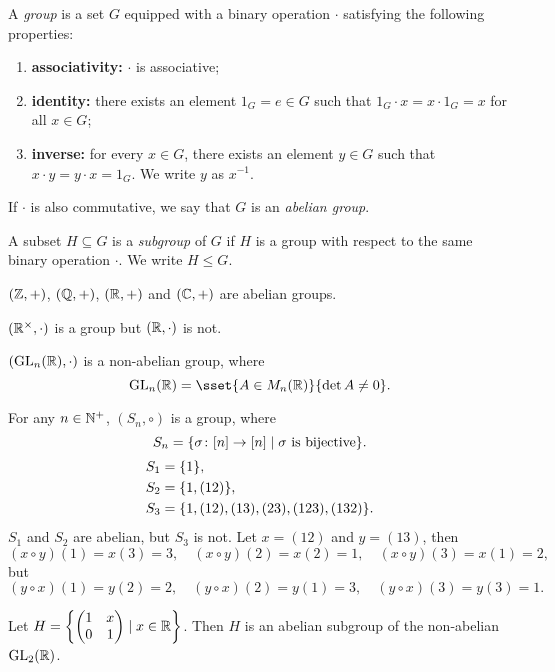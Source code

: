 \begin{definition*}[group] \label{def:group}
    A \emph{group} is a set $G$ equipped with a binary operation $\cdot$
    satisfying the following properties:
    \begin{enumerate}[label=\small(G\arabic*)]
        \item \textbf{associativity:} $\cdot$ is associative;
        \item \textbf{identity:} there exists an element $1_G = e \in G$
            such that $1_G \cdot x = x \cdot 1_G = x$ for all $x \in G$;
        \item \textbf{inverse:} for every $x \in G$, there exists an element
            $y \in G$ such that $x \cdot y = y \cdot x = 1_G$.
            We write $y$ as $x^{-1}$.
    \end{enumerate}

    If $\cdot$ is also commutative, we say that $G$ is an
    \emph{abelian group}.

    A subset $H \subseteq G$ is a \emph{subgroup} of $G$ if $H$ is a group
    with respect to the same binary operation $\cdot$.
    We write $H \le G$.
\end{definition*}

\begin{examples}
    \item $(\mathbb{Z}, +)$, $(\mathbb{Q}, +)$, $(\mathbb{R}, +)$ and $(\mathbb{C}, +)$ are abelian groups.
    \item $(\mathbb{R}^\times, \cdot)$ is a group but $(\mathbb{R}, \cdot)$ is not.
    \item $(\operatorname{GL}_n(\mathbb{R}), \cdot)$ is a non-abelian group, where \[
        \GL_n(\R) = \sset{A \in M_n(\R)}{\det A \neq 0}.
    \]
    \item For any $n \in \mathbb{N}^+$, $(S_n, \circ)$ is a group, where \[
        S_n = \{\sigma\colon [n] \to [n]
                \mid \sigma \text{ is bijective}\}.
    \] \begin{align*}
        S_1 &= \{1\}, \\
        S_2 &= \{1, (12)\}, \\
        S_3 &= \{1, (12), (13), (23), (123), (132)\}.
    \end{align*}
    $S_1$ and $S_2$ are abelian, but $S_3$ is not.
    Let $x = (12)$ and $y = (13)$, then \[
        (x \circ y)(1) = x(3) = 3, \quad
        (x \circ y)(2) = x(2) = 1, \quad
        (x \circ y)(3) = x(1) = 2,
    \] but \[
        (y \circ x)(1) = y(2) = 2, \quad
        (y \circ x)(2) = y(1) = 3, \quad
        (y \circ x)(3) = y(3) = 1.
    \]
    \item Let $H = \set*{\begin{pmatrix}
        1 & x \\
        0 & 1
    \end{pmatrix} \mid x \in \R}$.
    Then $H$ is an abelian subgroup of the non-abelian $\operatorname{GL}_2(\mathbb{R})$.
\end{examples}

